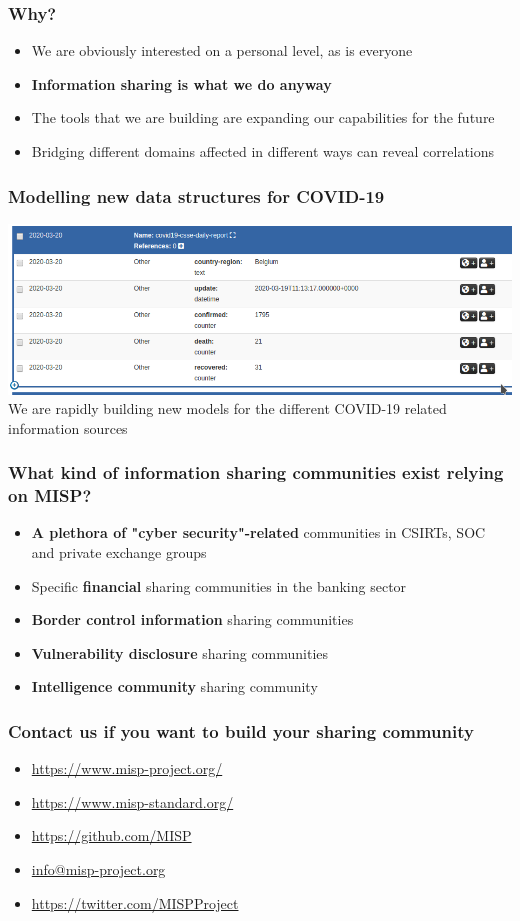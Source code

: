 \begin{frame}
 \frametitle{Why?}
 \begin{itemize}
         \item We are obviously interested on a personal level, as is everyone
         \item {\bf Information sharing is what we do anyway}
         \item The tools that we are building are expanding our capabilities for the future
         \item Bridging different domains affected in different ways can reveal correlations
 \end{itemize}
\end{frame}

\begin{frame}
    \frametitle{Modelling new data structures for COVID-19}
    \includegraphics[width=1.00\linewidth]{covidobject.png}
    We are rapidly building new models for the different COVID-19 related information sources
\end{frame}

\begin{frame}
     \frametitle{What kind of information sharing communities exist relying on MISP?}
     \begin{itemize}
       \item {\bf A plethora of "cyber security"-related} communities in CSIRTs, SOC and private exchange groups
       \item Specific {\bf financial} sharing communities in the banking sector
        \item {\bf Border control information} sharing communities
        \item {\bf Vulnerability disclosure} sharing communities
        \item {\bf Intelligence community} sharing community
     \end{itemize}
\end{frame}

\begin{frame}
  \frametitle{Contact us if you want to build your sharing community}
  \begin{itemize}
    \item \url{https://www.misp-project.org/}
    \item \url{https://www.misp-standard.org/}
    \item \url{https://github.com/MISP}
    \item \url{info@misp-project.org}
    \item \url{https://twitter.com/MISPProject}
  \end{itemize}
\end{frame}


